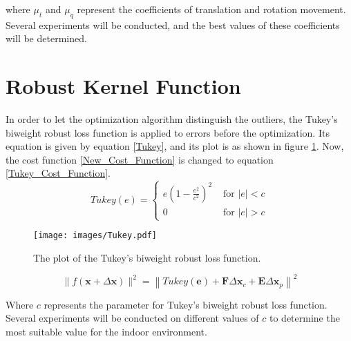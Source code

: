 where $\mu_{t}$ and $\mu_{q}$ represent the coefficients of translation and rotation movement. Several experiments will be conducted, and the best values of these coefficients will be determined.

\section{Robust Kernel Function}
In order to let the optimization algorithm distinguish the outliers, the Tukey's biweight robust loss function is applied to errors before the optimization. Its equation is given by equation \ref{Tukey}, and its plot is as shown in figure \ref{Tukey_Plot}. Now, the cost function \ref{New_Cost_Function} is changed to equation \ref{Tukey_Cost_Function}.
\begin{equation}
    Tukey(e)=\left\{\begin{array}{ll}
        e\left(1-\frac{e^{2}}{c^{2}}\right)^{2} & \text { for }|e|<c \\
        0 & \text { for }|e|>c
        \end{array}\right.\label{Tukey}
\end{equation}
\begin{figure}[thb]
    \centering
    \texttt{[image: images/Tukey.pdf]}
    \caption[The plot of the Tukey's biweight robust loss function.]{The plot of the Tukey's biweight robust loss function.}\label{Tukey_Plot}
\end{figure}
\begin{equation}
    \|f(\boldsymbol{x}+\Delta \boldsymbol{x})\|^{2}=\left\|Tukey(\boldsymbol{e})+\boldsymbol{F} \Delta \boldsymbol{x}_{c}+\boldsymbol{E} \Delta \boldsymbol{x}_{p}\right\|^{2}\label{Tukey_Cost_Function}
\end{equation}

Where $c$ represents the parameter for Tukey's biweight robust loss function. Several experiments will be conducted on different values of $c$ to determine the most suitable value for the indoor environment. 